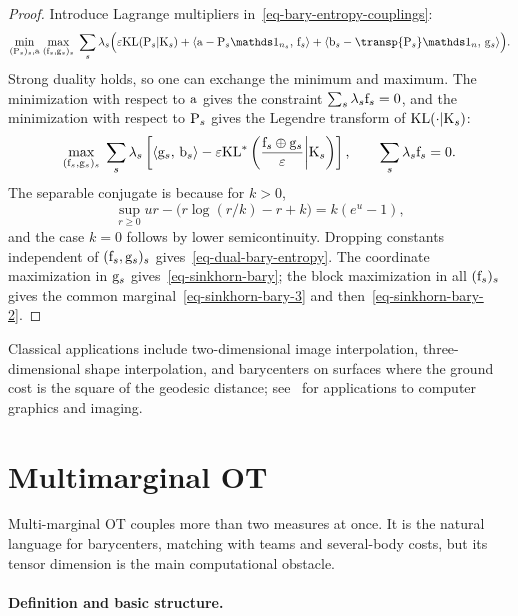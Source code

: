 \begin{proof}
	Introduce Lagrange multipliers in~\eqref{eq-bary-entropy-couplings}:
	\begin{align*}
		\umin{(\P_s)_s,\a}
		\umax{(\fD_s,\gD_s)_s}
		\sum_s\la_s\Big(
			\epsilon\KLD(\P_s|\K_s)
			+\dotp{\a-\P_s\ones_{n_s}}{\fD_s}
			+\dotp{\b_s-\transp{\P_s}\ones_n}{\gD_s}
		\Big).
	\end{align*}
	Strong duality holds, so one can exchange the minimum and maximum. The minimization with respect to $\a$ gives the constraint $\sum_s\la_s\fD_s=0$, and the minimization with respect to $\P_s$ gives the Legendre transform of $\KLD(\cdot|\K_s)$:
	\[
		\umax{(\fD_s,\gD_s)_s}
		\sum_s\la_s
		\left[
			\dotp{\gD_s}{\b_s}
			-\epsilon
			\KLD^*\left(\frac{\fD_s\oplus\gD_s}{\epsilon}\middle|\K_s\right)
		\right],
		\qquad
		\sum_s\la_s\fD_s=0.
	\]
	The separable conjugate is
	because for $k>0$,
	\[
		\sup_{r\geq0}
		ur-\big(r\log(r/k)-r+k\big)
		=
		k(e^u-1),
	\]
	and the case $k=0$ follows by lower semicontinuity. Dropping constants independent of $(\fD_s,\gD_s)_s$ gives~\eqref{eq-dual-bary-entropy}. The coordinate maximization in $\gD_s$ gives~\eqref{eq-sinkhorn-bary}; the block maximization in all $(\fD_s)_s$ gives the common marginal~\eqref{eq-sinkhorn-bary-3} and then~\eqref{eq-sinkhorn-bary-2}.
\end{proof}

Classical applications include two-dimensional image interpolation, three-dimensional shape interpolation, and barycenters on surfaces where the ground cost is the square of the geodesic distance; see~\cite{2015-solomon-siggraph} for applications to computer graphics and imaging.

\section{Multimarginal OT}
\label{sec-multimarginal-ot}
\label{subsec:multi-marginal}

Multi-marginal OT couples more than two measures at once. It is the natural language for barycenters, matching with teams and several-body costs, but its tensor dimension is the main computational obstacle.

\paragraph{Definition and basic structure.}

